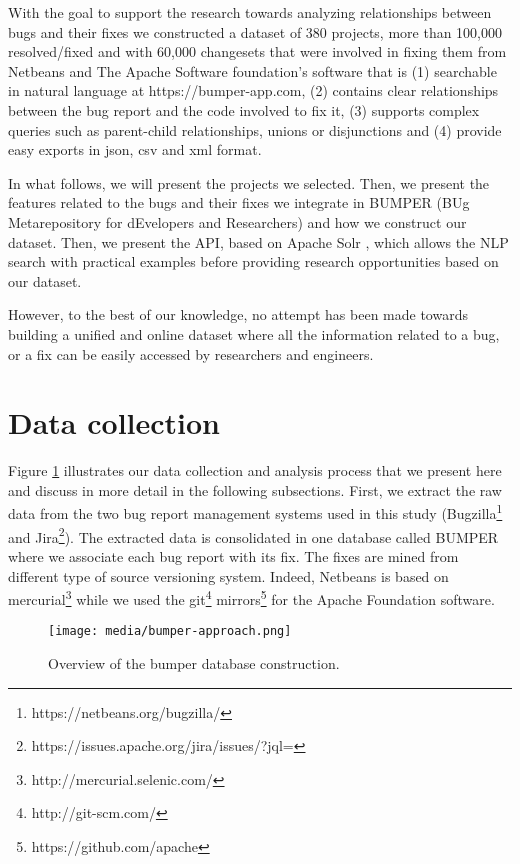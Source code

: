 
With the goal to support the research towards analyzing relationships between bugs and their fixes we constructed a dataset of 380 projects, more than 100,000 resolved/fixed and with 60,000 changesets that were involved in fixing them from Netbeans and The Apache Software foundation's software that is (1) searchable in natural language at https://bumper-app.com, (2) contains clear relationships between the bug report and the code involved to fix it, (3) supports complex queries such as parent-child relationships, unions or disjunctions and (4) provide easy exports in json, csv and xml format.

In what follows, we will present the projects we selected. Then, we present the features related to the bugs and their fixes we integrate in BUMPER (BUg Metarepository for dEvelopers and Researchers) and how we construct our dataset. Then, we present the API, based on Apache Solr \cite{Nayrolles2014b}, which allows the NLP search with practical examples before providing research opportunities based on our dataset.


However, to the best of our knowledge, no attempt has been made towards building a unified and online dataset where all the information related to a bug, or a fix can be easily accessed by researchers and engineers.

\section{Data collection\label{sec:data-collection}}

Figure \ref{fig:bumper-approach} illustrates our data collection and analysis process that we present here and discuss in more detail in the following subsections. First, we extract the raw data from the two bug report management systems used in this study (Bugzilla\footnote{https://netbeans.org/bugzilla/} and Jira\footnote{https://issues.apache.org/jira/issues/?jql=}). The extracted data is consolidated in one database called BUMPER where we associate each bug report with its fix. The fixes are mined from different type of source versioning system. Indeed, Netbeans is based on mercurial\footnote{ http://mercurial.selenic.com/} while we used the git\footnote{http://git-scm.com/} mirrors\footnote{https://github.com/apache} for the Apache Foundation software.

\begin{figure}[h!]
  \centering
    \texttt{[image: media/bumper-approach.png]}
    \caption{Overview of the bumper database construction.
    \label{fig:bumper-approach}}
\end{figure}


